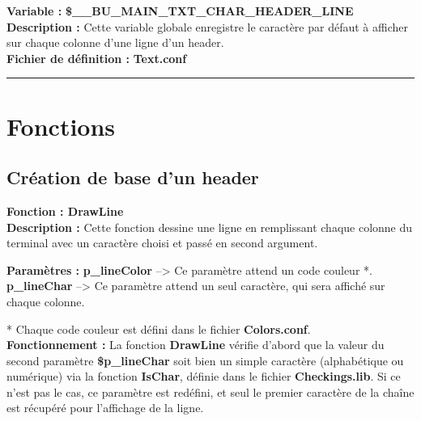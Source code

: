 \documentclass[a4paper,10pt]{article}
\begin{document}
\textbf{Variable :} \textbf{\color{orange}\$\_\_BU\_MAIN\_TXT\_CHAR\_HEADER\_LINE\color{white}}\\[1\baselineskip]

\textbf{Description :} Cette variable globale enregistre le caractère par défaut à afficher sur chaque colonne d'une ligne d'un header.\\[1\baselineskip]

\textbf{Fichier de définition :} \textbf{\color{lime}Text.conf\color{white}}\\[1\baselineskip]



\color{red}\par\noindent\rule{\textwidth}{0.4pt}\color{white}

\color{red}
\section{Fonctions}\color{white}

\color{green}
\subsection{Création de base d'un header}\color{white}

\textbf{Fonction : \color{mauve}DrawLine\color{white}}\\[1\baselineskip]
\textbf{Description :}\linebreak
Cette fonction dessine une ligne en remplissant chaque colonne du terminal avec un caractère choisi et passé en second argument.\linebreak

\textbf{Paramètres :}\linebreak
\textbf{\color{orange}p\_lineColor\color{white}} --> Ce paramètre attend un code couleur *.\linebreak
\textbf{\color{orange}p\_lineChar\color{white}} --> Ce paramètre attend un seul caractère, qui sera affiché sur chaque colonne.\linebreak

* Chaque code couleur est défini dans le fichier \textbf{\color{lime}Colors.conf\color{white}}.\\[1\baselineskip]

\textbf{Fonctionnement :}\linebreak
La fonction \textbf{\color{mauve}DrawLine\color{white}} vérifie d'abord que la valeur du second paramètre \textbf{\color{orange}\$p\_lineChar\color{white}} soit bien un simple caractère (alphabétique ou numérique) via la fonction \textbf{\color{mauve}IsChar\color{white}}, définie dans le fichier \textbf{\color{lime}Checkings.lib\color{white}}. Si ce n'est pas le cas, ce paramètre est redéfini, et seul le premier caractère de la chaîne est récupéré pour l'affichage de la ligne.\\[1\baselineskip]
\end{document}
